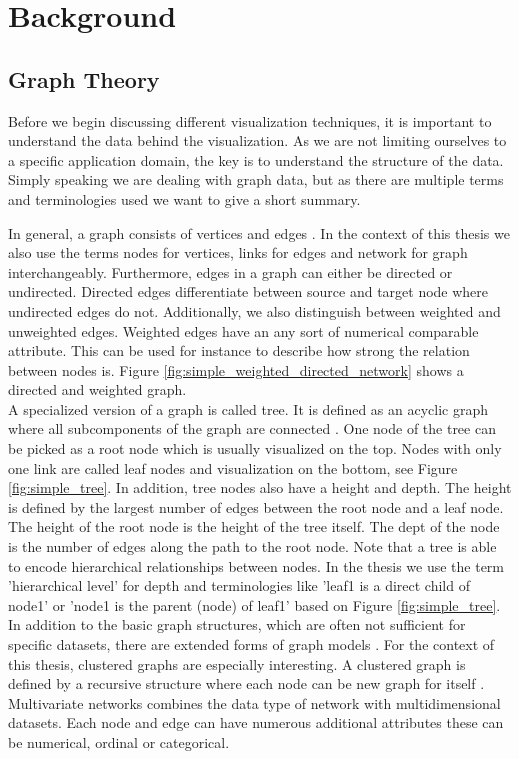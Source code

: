 \chapter{Background}

\section{Graph Theory}

Before we begin discussing different visualization techniques, it is important to understand the data behind the visualization. As we are not limiting ourselves to a specific application domain, the key is to understand the structure of the data. Simply speaking we are dealing with graph data, but as there are multiple terms and terminologies used we want to give a short summary. 

In general, a graph consists of vertices and edges \cite{diestel_graph_2017}. In the context of this thesis we also use the terms nodes for vertices, links for edges and network for graph interchangeably. Furthermore, edges in a graph can either be directed or undirected. Directed edges differentiate between source and target node where undirected edges do not. Additionally, we also distinguish between weighted and unweighted edges. Weighted edges have an any sort of numerical comparable attribute. This can be used for instance to describe how strong the relation between nodes is. Figure \ref{fig:simple_weighted_directed_network} shows a directed and weighted graph.\\
A specialized version of a graph is called tree. It is defined as an acyclic graph where all subcomponents of the graph are connected \cite{diestel_graph_2017}. One node of the tree can be picked as a root node which is usually visualized on the top. Nodes with only one link are called leaf nodes and visualization on the bottom, see Figure \ref{fig:simple_tree}. 
In addition, tree nodes also have a height and depth. The height is defined by the largest number of edges between the root node and a leaf node. The height of the root node is the height of the tree itself. The dept of the node is the number of edges along the path to the root node. Note that a tree is able to encode hierarchical relationships between nodes. In the thesis we use the term 'hierarchical level' for depth and terminologies like 'leaf1 is a direct child of node1' or 'node1 is the parent (node) of leaf1' based on Figure \ref{fig:simple_tree}.
In addition to the basic graph structures, which are often not sufficient for specific datasets, there are extended forms of graph models \cite{bertault_algorithm_1999}. 
For the context of this thesis, clustered graphs are especially interesting. A clustered graph is defined by a recursive structure where each node can be new graph for itself \cite{eades_multilevel_1997}. 
Multivariate networks \cite{kerren_introduction_2014} combines the data type of network with multidimensional datasets. Each node and edge can have numerous additional attributes these can be numerical, ordinal or categorical.

